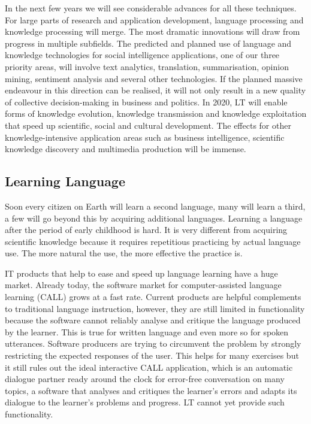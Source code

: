 \documentclass[10pt, plain]{../../metanetpaper}
\begin{document}
\begin{multicols}{2}
In the next few years we will see considerable advances for all these techniques. For large parts of research and application development, language processing and knowledge processing will merge. The most dramatic innovations will draw from progress in multiple subfields. The predicted and planned use of language and knowledge technologies for social intelligence applications, one of our three priority areas, will involve text analytics, translation, summarisation, opinion mining, sentiment analysis and several other technologies. If the planned massive endeavour in this direction can be realised, it will not only result in a new quality of collective decision-making in business and politics. In 2020, LT will enable forms of knowledge evolution, knowledge transmission and knowledge exploitation that speed up scientific, social and cultural development. The effects for other knowledge-intensive application areas such as business intelligence, scientific knowledge discovery and multimedia production will be immense.

\subsection{Learning Language}
\label{sec:learning-language}

Soon every citizen on Earth will learn a second language, many will learn a third, a few will go beyond this by acquiring additional languages. Learning a language after the period of early childhood is hard. It is very different from acquiring scientific knowledge because it requires repetitious practicing by actual language use. The more natural the use, the more effective the practice is.
 
IT products that help to ease and speed up language learning have a huge market. Already today, the software market for computer-assisted language learning (CALL) grows at a fast rate. Current products are helpful complements to traditional language instruction, however, they are still limited in functionality because the software cannot reliably analyse and critique the language produced by the learner. This is true for written language and even more so for spoken utterances. Software producers are trying to circumvent the problem by strongly restricting the expected responses of the user. This helps for many exercises but it still rules out the ideal interactive CALL application, which is an automatic dialogue partner ready around the clock for error-free conversation on many topics, a software that analyses and critiques the learner’s errors and adapts its dialogue to the learner’s problems and progress. LT cannot yet provide such functionality.
 

\end{multicols}
\end{document}
